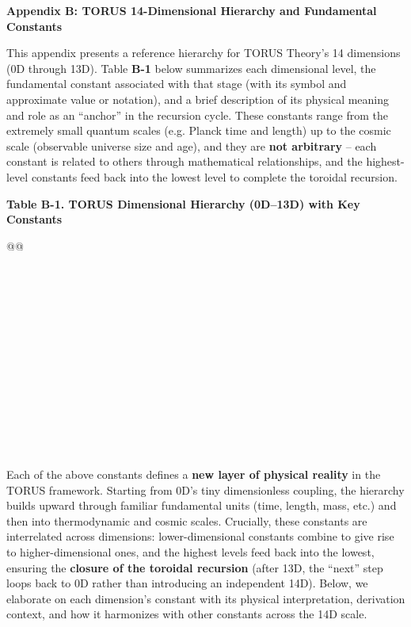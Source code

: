 \documentclass[
]{article}
\author{}
\date{}
\begin{document}
\textbf{Appendix B: TORUS 14-Dimensional Hierarchy and Fundamental
Constants}

This appendix presents a reference hierarchy for TORUS Theory's 14
dimensions (0D through 13D). Table \textbf{B-1} below summarizes each
dimensional level, the fundamental constant associated with that stage
(with its symbol and approximate value or notation), and a brief
description of its physical meaning and role as an ``anchor'' in the
recursion cycle. These constants range from the extremely small quantum
scales (e.g. Planck time and length) up to the cosmic scale (observable
universe size and age), and they are \textbf{not arbitrary} -- each
constant is related to others through mathematical relationships, and
the highest-level constants feed back into the lowest level to complete
the toroidal recursion\hspace{0pt}.

\textbf{Table B-1. TORUS Dimensional Hierarchy (0D--13D) with Key
Constants}\hspace{0pt}

\begin{longtable}[]{@{}@{}}
\toprule\noalign{}
\endhead
\bottomrule\noalign{}
\endlastfoot
 \\
 \\
 \\
 \\
 \\
 \\
 \\
 \\
 \\
 \\
 \\
 \\
 \\
 \\
\end{longtable}

Each of the above constants defines a \textbf{new layer of physical
reality} in the TORUS framework. Starting from 0D's tiny dimensionless
coupling, the hierarchy builds upward through familiar fundamental units
(time, length, mass, etc.) and then into thermodynamic and cosmic
scales. Crucially, these constants are interrelated across dimensions:
lower-dimensional constants combine to give rise to higher-dimensional
ones, and the highest levels feed back into the lowest, ensuring the
\textbf{closure of the toroidal recursion} (after 13D, the ``next'' step
loops back to 0D rather than introducing an independent
14D)\hspace{0pt}. Below, we elaborate on each dimension's constant with
its physical interpretation, derivation context, and how it harmonizes
with other constants across the 14D scale.
\end{document}
